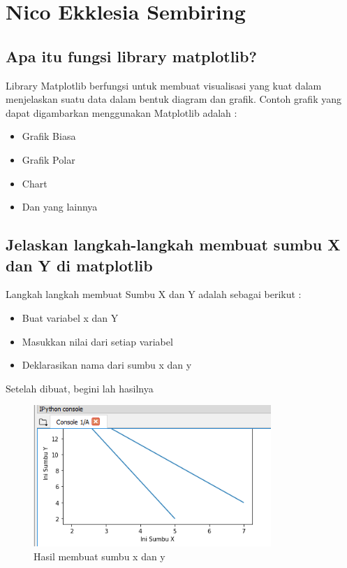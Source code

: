 \section{Nico Ekklesia Sembiring}
\subsection{Apa itu fungsi library matplotlib?}
Library Matplotlib berfungsi untuk membuat visualisasi yang kuat dalam menjelaskan suatu data dalam bentuk diagram dan grafik. 
Contoh grafik yang dapat digambarkan menggunakan Matplotlib adalah :
\begin{itemize}
    \item Grafik Biasa 
    \item Grafik Polar
    \item Chart
    \item Dan yang lainnya
\end{itemize}

\subsection{Jelaskan langkah-langkah membuat sumbu X dan Y di matplotlib}
Langkah langkah membuat Sumbu X dan Y adalah sebagai berikut :
\begin{itemize}
    \item Buat variabel x dan Y
    \item Masukkan nilai dari setiap variabel
    
    \item Deklarasikan nama dari sumbu x dan y 
    
\end{itemize}

Setelah dibuat, begini lah hasilnya
\begin{figure}[H]
	\includegraphics[width=9cm]{figures/6/Teori/1174096/1.png}
	\caption{Hasil membuat sumbu x dan y}
	\centering
\end{figure}

